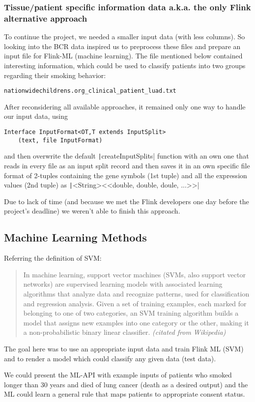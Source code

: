 \documentclass{bioinfo}
\begin{document}
\begin{methods}
\subsubsection{Tissue/patient specific information data a.k.a. the only Flink alternative approach}

To continue the project, we needed a smaller input data (with less columns). So looking into the BCR data inspired us to preprocess these files and prepare an input file for Flink-ML (machine learning). The file mentioned below contained interesting information, which could be used to classify patients into two groups regarding their smoking behavior:
\begin{verbatim}
nationwidechildrens.org_clinical_patient_luad.txt
\end{verbatim}

After reconsidering all available approaches, it remained only one way to handle our input data, using
\begin{verbatim}
Interface InputFormat<OT,T extends InputSplit>
	(text, file InputFormat)
\end{verbatim}
and then overwrite the default 
\texttt|createInputSplits|
function with an own one that reads in every file as an input split record and then saves it in an own specific file format of 2-tuples containing the gene symbols (1st tuple) and all the expression values (2nd tuple) as \texttt|<String><<double, double, doule, ...>>| 

Due to lack of time (and because we met the Flink developers one day before the project's deadline) we weren't able to finish this approach.


\subsection{Machine Learning Methods}

Referring the definition of SVM:

\begin{quotation}
In machine learning, support vector machines (SVMs, also support vector networks) are supervised learning models with associated learning algorithms that analyze data and recognize patterns, used for classification and regression analysis. Given a set of training examples, each marked for belonging to one of two categories, an SVM training algorithm builds a model that assigns new examples into one category or the other, making it a non-probabilistic binary linear classifier. \textit{(citated from Wikipedia)}
\end{quotation}

The goal here was to use an appropriate input data and train Flink ML (SVM) and to render a model which could classify any given data (test data).

We could present the ML-API with example inputs of patients who smoked longer than 30 years and died of lung cancer (death as a desired output) and the ML could learn a general rule that maps patients to appropriate consent status.



\end{methods}
\end{document}
